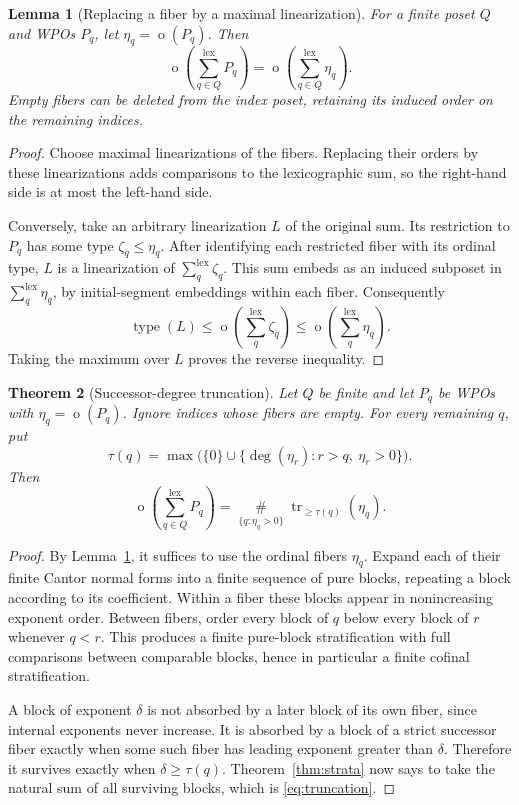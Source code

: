 \documentclass[11pt,a4paper]{article}
\newtheorem{theorem}{Theorem}[section]
\newtheorem{lemma}[theorem]{Lemma}
\theoremstyle{definition}
\theoremstyle{remark}
\newcommand{\ot}{\operatorname{o}}
\newcommand{\bigns}{\mathop{\#}\limits}
\newcommand{\tr}{\operatorname{tr}}
\newcommand{\lxs}{\mathop{\sum}\limits^{\mathrm{lex}}}
\begin{document}
\begin{lemma}[Replacing a fiber by a maximal linearization]
\label{lem:replacement}
For a finite poset $Q$ and WPOs $P_q$, let $\eta_q=\ot(P_q)$. Then
\[
 \ot\left(\lxs_{q\in Q}P_q\right)
   =\ot\left(\lxs_{q\in Q}\eta_q\right).
\]
Empty fibers can be deleted from the index poset, retaining its induced
order on the remaining indices.
\end{lemma}

\begin{proof}
Choose maximal linearizations of the fibers. Replacing their orders by
these linearizations adds comparisons to the lexicographic sum, so the
right-hand side is at most the left-hand side.

Conversely, take an arbitrary linearization $L$ of the original sum.
Its restriction to $P_q$ has some type $\zeta_q\le\eta_q$. After identifying
each restricted fiber with its ordinal type, $L$ is a linearization of
$\sum_q^{\mathrm{lex}}\zeta_q$. This sum embeds as an induced subposet in
$\sum_q^{\mathrm{lex}}\eta_q$, by initial-segment embeddings within each
fiber. Consequently
\[
 \operatorname{type}(L)
 \le\ot\left(\lxs_q\zeta_q\right)
 \le\ot\left(\lxs_q\eta_q\right).
\]
Taking the maximum over $L$ proves the reverse inequality.
\end{proof}

\begin{theorem}[Successor-degree truncation]\label{thm:truncation}
Let $Q$ be finite and let $P_q$ be WPOs with $\eta_q=\ot(P_q)$. Ignore
indices whose fibers are empty. For every remaining $q$, put
\[
 \tau(q)=\max\bigl(\{0\}\cup\{\deg(\eta_r):r>q,\ \eta_r>0\}\bigr).
\]
Then
\begin{equation}\label{eq:truncation}
 \boxed{\displaystyle
 \ot\left(\lxs_{q\in Q}P_q\right)
    =\bigns_{\{q:\eta_q>0\}}\tr_{\ge\tau(q)}(\eta_q).}
\end{equation}
\end{theorem}

\begin{proof}
By Lemma~\ref{lem:replacement}, it suffices to use the ordinal fibers
$\eta_q$. Expand each of their finite Cantor normal forms into a finite
sequence of pure blocks, repeating a block according to its coefficient.
Within a fiber these blocks appear in nonincreasing exponent order.
Between fibers, order every block of $q$ below every block of $r$ whenever
$q<r$. This produces a finite pure-block stratification with full
comparisons between comparable blocks, hence in particular a finite
cofinal stratification.

A block of exponent $\delta$ is not absorbed by a later block of its own
fiber, since internal exponents never increase. It is absorbed by a block
of a strict successor fiber exactly when some such fiber has leading
exponent greater than $\delta$. Therefore it survives exactly when
$\delta\ge\tau(q)$. Theorem~\ref{thm:strata} now says to take the natural
sum of all surviving blocks, which is \eqref{eq:truncation}.
\end{proof}
\end{document}
